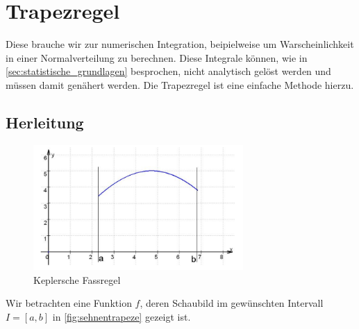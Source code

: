 \section{Trapezregel}
\label{sec:trapezregel}
Diese brauche wir zur numerischen Integration, beipielweise um Warscheinlichkeit in einer Normalverteilung zu berechnen. Diese Integrale können, wie in \autoref{sec:statistische_grundlagen} besprochen, nicht analytisch gelöst werden und müssen damit genähert werden. Die Trapezregel ist eine einfache Methode hierzu.
\subsection{Herleitung}
\label{sec:herleitung}

\begin{figure}[h]
    \centering
    \includegraphics[width=8cm]{Bilder/keplersche_fassregel_funktion.png}
    \caption{Keplersche Fassregel \cite{skript}}    
    \label{fig:keplersche_fassregel}
\end{figure}
Wir betrachten eine Funktion $f$, deren Schaubild im gewünschten Intervall $I = [a, b]$ in \autoref{fig:sehnentrapeze} gezeigt ist.

